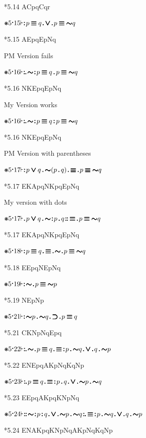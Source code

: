\documentclass[12pt]{article}
\newcommand{\pmthm}{\mathpunct{\text{\scalebox{.5}[1]{$\boldsymbol\vdash$}}}} %
\newcommand{\pmast}{\text{\resizebox{!}{.75\height}{\ding{107}}}} %
\newcommand{\pmcdot}{\text{\raisebox{.05cm}{$\boldsymbol\cdot$}}} %
\newcommand{\pmd}{\hbox{\rule{.3ex}{.3ex}}} %
\newcommand{\pmdd}{\overset{\pmd}{\pmd}} %
\newcommand{\pmdot}{\mathinner{\pmd}}
\newcommand{\pmdott}{\mathinner{\pmdd}}
\newcommand{\pmdottt}{\mathinner{\pmdd\hspace{1pt}\pmd}}
\newcommand{\pmdotttt}{\mathinner{\pmdd\hspace{1pt}\pmdd}}
\newcommand{\pmnot}{\mathord{\ooalign{$\boldsymbol{\sim}\mkern.5mu$\hidewidth\cr$\boldsymbol{\sim}$\cr\hidewidth$\mkern.5mu\boldsymbol{\sim}$}}}
\newcommand{\pmor}{\mathbin{\ooalign{$\boldsymbol{\vee}\mkern.5mu$\hidewidth\cr$\boldsymbol{\vee}$\cr\hidewidth$\mkern.5mu\boldsymbol{\vee}$}}}
\newcommand{\pmimp}{\mathbin{\ooalign{$\boldsymbol{\supset}\mkern.5mu$\hidewidth\cr$\boldsymbol{\supset}$\cr\hidewidth$\mkern.5mu\boldsymbol{\supset}$}}} %
\newcommand{\pmand}{\mathbin{\pmd}}%
\newcommand{\pmandd}{\mathbin{\pmdd}}
\newcommand{\pmiff}{\mathbin{\ooalign{$\boldsymbol{\equiv}\mkern.5mu$\hidewidth\cr$\boldsymbol{\equiv}$\cr\hidewidth$\mkern.5mu\boldsymbol{\equiv}$}}} %
\begin{document}
*5.14 ACpqCqr

$\pmast 5 \pmcdot 15 \pmthm \pmdott p \pmiff q \pmdot \pmor \pmdot p \pmiff \pmnot q $

*5.15 AEpqEpNq

PM Version fails

$\pmast 5 \pmcdot 16 \pmthm \pmdottt \pmnot \pmdott p \pmiff q \pmand p \pmiff \pmnot q $

*5.16 NKEpqEpNq

My Version works

$\pmast 5 \pmcdot 16 \pmthm \pmdottt \pmnot \pmdott p \pmiff q \pmandd p \pmiff \pmnot q $

*5.16 NKEpqEpNq

PM Version with parentheses

$\pmast 5 \pmcdot 17 \pmthm \pmdott p \pmor q \pmand \pmnot ( p \pmand q ) \pmdot \pmiff \pmdot p \pmiff \pmnot q     $

*5.17 EKApqNKpqEpNq

My version with dots 

$\pmast 5 \pmcdot 17 \pmthm \pmdot p \pmor q \pmand \pmnot \pmdott p \pmand q \pmdotttt \pmiff \pmdot p \pmiff \pmnot q  $

*5.17 EKApqNKpqEpNq

$\pmast 5 \pmcdot 18 \pmthm \pmdott p \pmiff q \pmdot \pmiff \pmdot \pmnot \pmdot p \pmiff \pmnot q  $

*5.18 EEpqNEpNq

$\pmast 5 \pmcdot 19 \pmthm \pmdott \pmnot \pmdot p \pmiff \pmnot p  $

*5.19 NEpNp

$\pmast 5 \pmcdot 21 \pmthm \pmdott \pmnot p \pmand \pmnot q \pmdot \pmimp \pmdot p \pmiff q $

*5.21 CKNpNqEpq

$\pmast 5 \pmcdot 22 \pmthm \pmdottt \pmnot \pmdot p \pmiff q \pmdot \pmiff \pmdott p \pmand \pmnot q \pmdot \pmor \pmdot q \pmand \pmnot p $

*5.22 ENEpqAKpNqKqNp

$\pmast 5 \pmcdot 23 \pmthm \pmdottt p \pmiff q \pmdot \pmiff \pmdott p \pmand q  \pmdot \pmor \pmdot \pmnot p \pmand \pmnot q $

*5.23 EEpqAKpqKNpNq

$\pmast 5 \pmcdot 24 \pmthm \pmdotttt \pmnot \pmdott p \pmandd q \pmdot \pmor \pmdot \pmnot p \pmand \pmnot q \pmdottt \pmiff \pmdott p \pmand \pmnot q \pmdot \pmor \pmdot q \pmand \pmnot p  $

*5.24 ENAKpqKNpNqAKpNqKqNp
\end{document}
